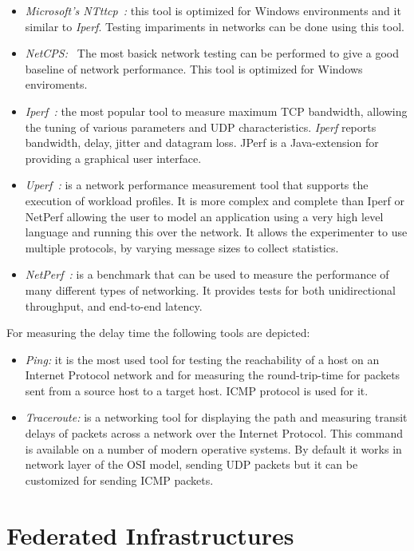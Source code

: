 \begin{itemize}
\item \emph{Microsoft's
    NTttcp~\cite{Microsoft2013}:}
  this tool is optimized for Windows environments and it similar to
  \emph{Iperf}. Testing impariments in networks can be done using this tool.
\item \emph{NetCPS:~\cite{Aase1998}} The most basick network testing can be performed to give a
  good baseline of network performance. This tool is optimized for Windows
  enviroments.
\item \emph{Iperf~\cite{Iperf2014}:} the most popular tool to measure maximum TCP bandwidth, allowing the
  tuning of various parameters and UDP characteristics. \emph{Iperf} reports
  bandwidth, delay, jitter and datagram loss. JPerf is a Java-extension for
  providing a graphical user interface.
\item \emph{Uperf~\cite{Microsystems2013}:} is a network
  performance measurement tool that supports the execution of workload profiles. It
  is more complex and complete than Iperf or NetPerf allowing the user to model
  an application using a very high level language and running this over the
  network. It allows the experimenter to use multiple protocols, by varying message sizes to
  collect statistics.
\item \emph{NetPerf~\cite{Company2012}:} is a benchmark that can be used to measure the performance of many different types of networking. It provides tests for both unidirectional throughput, and end-to-end latency.
\end{itemize}

For measuring the delay time the following tools are depicted:
\begin{itemize}
\item \emph{Ping:} it is the most used tool for testing the reachability of a host on an
  Internet Protocol network and for measuring the round-trip-time for packets sent
  from a source host to a target host. \ac{ICMP} protocol is used for it.
\item \emph{Traceroute:} is a networking tool for displaying the path and
  measuring transit delays of packets across a network over the Internet
  Protocol. This command is available on a number of modern operative systems. By
  default it works in network layer of the \acs{OSI} model, sending \ac{UDP} packets but it can be customized
  for sending \ac{ICMP} packets.
\end{itemize}

\section{Federated Infrastructures}


